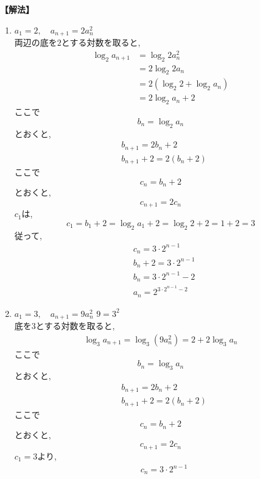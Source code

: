 \noindent\textbf{【解法】}
\begin{enumerate}[label=(\arabic*),parsep=3pt]
  \item $\displaystyle a_1=2,\quad a_{n+1}=2a_n^2$\\
        両辺の底を$2$とする対数を取ると,
        \begin{align*}
          \log_2a_{n+1}
           & =\log_2{2a_n^2}           \\
           & =2\log_2{2a_n}            \\
           & =2(\log_2{2}+\log_2{a_n}) \\
           & =2\log_2{a_n}+2
        \end{align*}
        ここで
        \[
          b_n=\log_2a_n
        \]
        とおくと,
        \begin{align*}
           & b_{n+1}=2b_n+2     \\
           & b_{n+1}+2=2(b_n+2)
        \end{align*}
        ここで
        \[
          c_n=b_n+2
        \]
        とおくと,
        \[
          c_{n+1}=2c_n
        \]
        $c_1$は,
        \[
          c_1=b_1+2=\log_2{a_1}+2=\log_2{2}+2=1+2=3
        \]
        従って,
        \begin{align*}
           & c_n=3\cdot2^{n-1}       \\
           & b_n+2=3\cdot2^{n-1}     \\
           & b_n=3\cdot2^{n-1}-2     \\
           & a_n=2^{3\cdot2^{n-1}-2}
        \end{align*}
  \item $\displaystyle a_1=3,\quad a_{n+1}=9a_n^2$
        $9=3^2$\\
        底を$3$とする対数を取ると,
        \begin{align*}
          \log_3a_{n+1}
          =\log_3(9a_n^2)=2+2\log_3a_n
        \end{align*}
        ここで
        \[
          b_n=\log_3a_n
        \]
        とおくと,
        \begin{align*}
           & b_{n+1}=2b_n+2     \\
           & b_{n+1}+2=2(b_n+2)
        \end{align*}
        ここで
        \[
          c_n=b_n+2
        \]
        とおくと,
        \[
          c_{n+1}=2c_n
        \]
        $c_1=3$より,
        \begin{align*}
           & c_n=3\cdot2^{n-1}       \\

\end{align*}
\end{enumerate}
